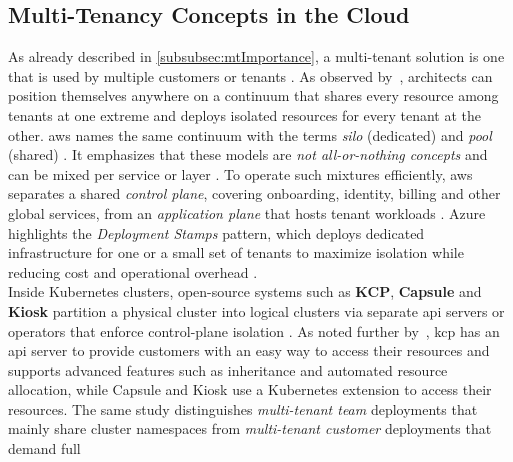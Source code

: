 \documentclass[11pt, a4paper, oneside, listof=totoc]{scrartcl}
\begin{document}
            \cleardoublepage

        \subsection{Multi-Tenancy Concepts in the Cloud}\label{subsec:mtConcepts}
            As already described in \autoref{subsubsec:mtImportance}, a multi-tenant solution is one
            that is used by multiple customers or tenants \parencite[p.~57]{azureWhitepaper}.
            As observed by~\cite[p.~137]{azureWhitepaper}, architects can position themselves
            anywhere on a continuum that shares every resource among tenants at one extreme and
            deploys isolated resources for every tenant at the other.
            \gls{aws} names the same continuum with the terms \textit{silo} (dedicated) and
            \textit{pool} (shared) \parencite[pp.~19--22]{awsSaaSArchitectureFundamentals}.
            It emphasizes that these models are \textit{not all-or-nothing concepts} and can be
            mixed per service or layer \parencite[p.~19]{awsSaaSArchitectureFundamentals}.
            To operate such mixtures efficiently, \gls{aws} separates a shared
            \textit{control plane}, covering onboarding, identity, billing and other global
            services, from an \textit{application plane} that hosts tenant workloads
            \parencite[p.~10]{awsSaaSArchitectureFundamentals}.
            Azure highlights the \textit{Deployment Stamps} pattern, which deploys dedicated
            infrastructure for one or a small set of tenants to maximize isolation while reducing
            cost and operational overhead \parencite[pp.~137--138]{azureWhitepaper}.
            \\
            Inside Kubernetes clusters, open-source systems such as \textbf{KCP}, \textbf{Capsule}
            and \textbf{Kiosk} partition a physical cluster into logical clusters via separate
            \gls{api} servers or operators that enforce control-plane isolation
            \parencite[p.~651]{nguyen2022}.
            As noted further by~\cite{nguyen2022}, \gls{kcp} has an \gls{api} server to provide
            customers with an easy way to access their resources and supports advanced features such
            as inheritance and automated resource allocation, while Capsule and Kiosk use a
            Kubernetes extension to access their resources.
            The same study distinguishes \textit{multi-tenant team} deployments that mainly share
            cluster namespaces from \textit{multi-tenant customer} deployments that demand full
\end{document}
